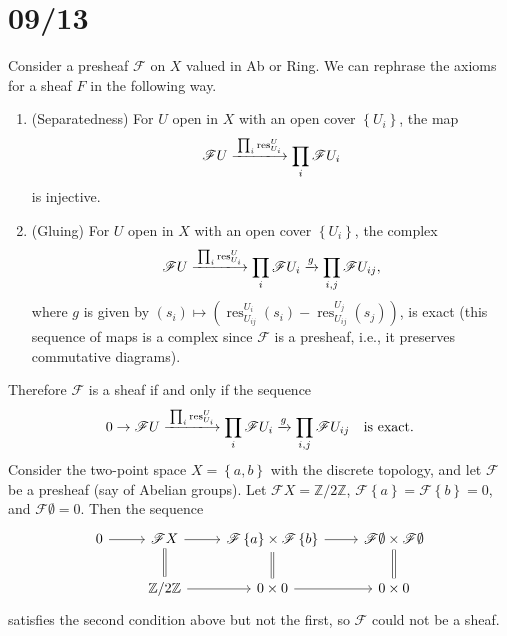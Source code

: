 \documentclass[11pt,leqno]{article}
\theoremstyle{plain}
\theoremstyle{definition}
\numberwithin{equation}{section}
\numberwithin{lem}{section}
\newcommand{\cbr}[1]{\left\{#1\right\}}
\DeclareMathOperator{\res}{res}
\begin{document}
\newpage\section{09/13}
Consider a presheaf $\mathscr F$ on $X$ valued in Ab or Ring. We can rephrase the axioms for a sheaf $F$ in the following way.
\begin{enumerate}[label=(\arabic*)]
    \item (Separatedness) For $U$ open in $X$ with an open cover $\cbr{U_i}$, the map
    \begin{equation}
        \mathscr FU\xlongrightarrow{\prod_i \res^U_{U_i}}\prod_i \mathscr FU_i
    \end{equation}
    is injective.
    \item (Gluing) For $U$ open in $X$ with an open cover $\cbr{U_i}$, the complex
    \begin{equation}
        \mathscr FU\xlongrightarrow{\prod_i \res^U_{U_i}}\prod_i \mathscr FU_i\xrightarrow{g} \prod_{i,j}\mathscr FU_{ij},
    \end{equation}
    where $g$ is given by $(s_i)\mapsto (\res^{U_i}_{U_{ij}}(s_i) - \res^{U_j}_{U_{ij}}(s_j))$,
    is exact (this sequence of maps is a complex since $\mathscr F$ is a presheaf, i.e., it preserves commutative diagrams).
\end{enumerate}
Therefore $\mathscr F$ is a sheaf if and only if the sequence 
\begin{equation}
    0\to \mathscr FU\xlongrightarrow{\prod_i \res^U_{U_i}}\prod_i \mathscr FU_i\xrightarrow{g} \prod_{i,j}\mathscr FU_{ij}\quad\text{is exact.}
\end{equation}
Consider the two-point space $X = \cbr{a,b}$ with the discrete topology, and let $\mathscr F$ be a presheaf (say of Abelian groups). Let $\mathscr FX = \mathbb Z/2\mathbb Z$, $\mathscr F\cbr{a} = \mathscr F\cbr{b} = 0$, and $\mathscr F\emptyset = 0$. Then the sequence
\begin{equation}
    \begin{tikzcd}
	0 & {\mathscr FX} & {\mathscr F\cbr{a}\times\mathscr F\cbr{b}} & {\mathscr F\emptyset\times \mathscr F\emptyset} \\
	& {\mathbb Z/2\mathbb Z} & {0\times 0} & {0\times 0}
	\arrow[from=1-1, to=1-2]
	\arrow[from=1-2, to=1-3]
	\arrow[Rightarrow, no head, from=1-2, to=2-2]
	\arrow[from=1-3, to=1-4]
	\arrow[Rightarrow, no head, from=1-3, to=2-3]
	\arrow[Rightarrow, no head, from=1-4, to=2-4]
	\arrow[from=2-2, to=2-3]
	\arrow[from=2-3, to=2-4]
\end{tikzcd}
\end{equation}
satisfies the second condition above but not the first, so $\mathscr F$ could not be a sheaf.
\end{document}
